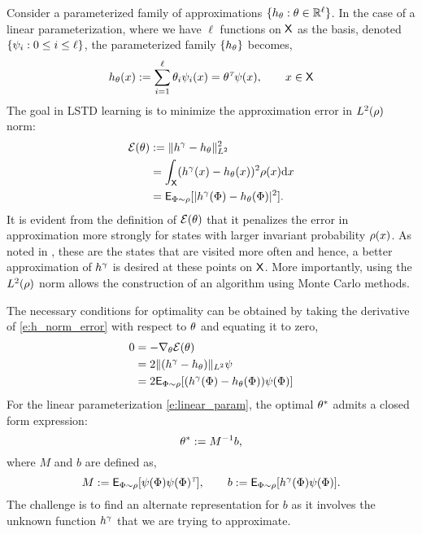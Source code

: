 Consider a parameterized family of approximations $\{h_\theta : \theta \in \mathbb{R}^\ell\}$. In the case of a linear parameterization, where we have $\ell$ functions on ${\sf X}$ as the basis, denoted $\{\psi_i : 0 \leq i \leq \ell\}$, the parameterized family $\{h_\theta\}$ becomes,
\begin{equation}
h_\param(x) := \sum_{i=1}^\ell \param_i \basis_i(x) = \param^\transpose \basis(x), \qquad x \in \state
\label{e:linear_param}
\end{equation}
The goal in LSTD learning is to minimize the approximation error in $L^2(\rho)$ norm:
\begin{equation}
\begin{aligned}
\mathcal{E}(\param) &:=  \| h^\discount - h_\param \|^2_{L^2} \\
& = \int_\state (h^\discount(x) - h_\param(x))^2 \pr(x) \ud x \\
& = \Expect_{\markovstate \sim \pr} [|h^\discount(\markovstate) - h_\param(\markovstate)|^2].
\label{e:h_norm_error}
\end{aligned}
\end{equation}
It is evident from the definition of $\mathcal{E}(\theta)$ that it penalizes the error in approximation more strongly for states with larger invariant probability $\rho(x)$. As noted in \cite{ctcn}, these are the states that are visited more often and hence, a better approximation of $h^\gamma$ is desired at these points on ${\sf X}$. More importantly, using the $L^2(\rho)$ norm allows the construction of an algorithm using Monte Carlo methods. 

The necessary conditions for optimality can be obtained by taking the derivative of \eqref{e:h_norm_error} with respect to $\theta$ and equating it to zero, 
\[
\begin{aligned}
0 &= - \nabla_\theta \mathcal{E}(\theta)\\
& = 2 \|(h^\gamma - h_\theta) \|_{L^2} \psi \\
& = 2 {\sf E}_{\Phi \sim \rho} [(h^\gamma(\Phi) - h_\theta(\Phi)) \psi(\Phi)]
\end{aligned}
\] 
For the linear parameterization \eqref{e:linear_param}, the optimal $\theta^*$ admits a closed form expression:
\begin{equation}
\param^* := M^{-1} b,
\label{e:param_opt_lstd}
\end{equation}
where $M$ and $b$ are defined as,
\begin{equation}
M: = \Expect_{\markovstate \sim \pr} [\basis(\markovstate) \basis(\markovstate)^\transpose], \qquad b:= \Expect_{\markovstate \sim \pr} [h^\discount(\markovstate) \basis(\markovstate)].
\label{e:lstd_M_b}
\end{equation}
The challenge is to find an alternate representation for $b$ as it involves the unknown function $h^\gamma$ that we are trying to approximate.  

